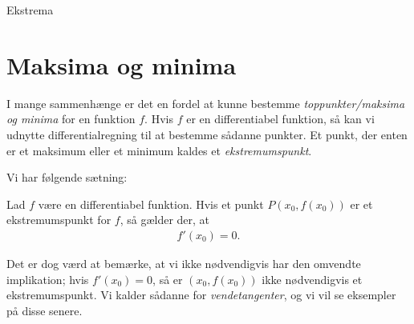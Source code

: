 \begin{center}
\Huge
Ekstrema
\end{center}
\section*{Maksima og minima}

I mange sammenhænge er det en fordel at kunne bestemme \textit{toppunkter/maksima og minima} for en funktion $f$. Hvis $f$ er en differentiabel funktion, så kan vi udnytte differentialregning til at bestemme sådanne punkter. Et punkt, der enten er et maksimum eller et minimum kaldes et \textit{ekstremumspunkt}. 

Vi har følgende sætning:
\begin{setn}[Ekstremumspunkter]
	Lad $f$ være en differentiabel funktion. Hvis et punkt $P(x_0,f(x_0))$ er et ekstremumspunkt for $f$, så gælder der, at 
	\begin{align*}
		f'(x_0) = 0.
	\end{align*}
\end{setn}
Det er dog værd at bemærke, at vi ikke nødvendigvis har den omvendte implikation; hvis $f'(x_0)=0$, så er $(x_0,f(x_0))$ ikke nødvendigvis et ekstremumspunkt. Vi kalder sådanne for \textit{vendetangenter}, og vi vil se eksempler på disse senere. 

